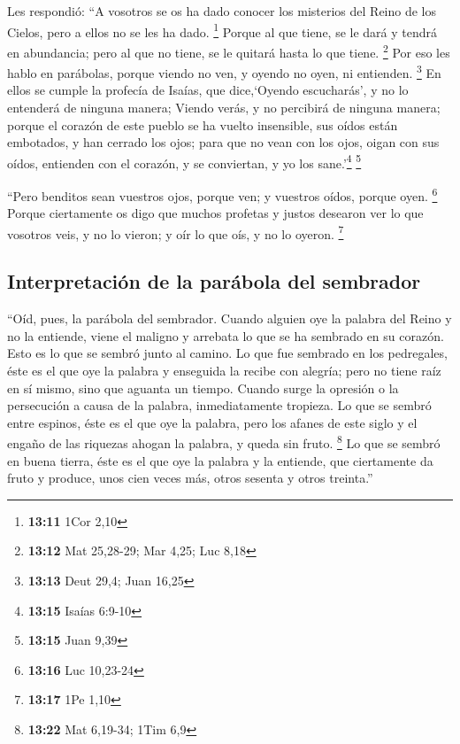 \begin{paracol}{2}
 Les respondió: ``A vosotros se os ha dado conocer los
misterios del Reino de los Cielos, pero a ellos no se les ha dado.
\footnote{\textbf{13:11} 1Cor 2,10}  Porque al que tiene,
se le dará y tendrá en abundancia; pero al que no tiene, se le quitará
hasta lo que tiene. \footnote{\textbf{13:12} Mat 25,28-29; Mar 4,25; Luc
  8,18}  Por eso les hablo en parábolas, porque viendo no
ven, y oyendo no oyen, ni entienden. \footnote{\textbf{13:13} Deut 29,4;
  Juan 16,25}  En ellos se cumple la profecía de Isaías,
que dice,`Oyendo escucharás', y no lo entenderá de ninguna manera;
Viendo verás, y no percibirá de ninguna manera;  porque
el corazón de este pueblo se ha vuelto insensible, sus oídos están
embotados, y han cerrado los ojos; para que no vean con los ojos, oigan
con sus oídos, entienden con el corazón, y se conviertan, y yo los
sane.'\footnote{\textbf{13:15} Isaías 6:9-10} \footnote{\textbf{13:15}
  Juan 9,39}

 ``Pero benditos sean vuestros ojos, porque ven; y
vuestros oídos, porque oyen. \footnote{\textbf{13:16} Luc 10,23-24}
 Porque ciertamente os digo que muchos profetas y justos
desearon ver lo que vosotros veis, y no lo vieron; y oír lo que oís, y
no lo oyeron. \footnote{\textbf{13:17} 1Pe 1,10}

\hypertarget{interpretaciuxf3n-de-la-paruxe1bola-del-sembrador}{%
\subsection{Interpretación de la parábola del
sembrador}\label{interpretaciuxf3n-de-la-paruxe1bola-del-sembrador}}

 ``Oíd, pues, la parábola del sembrador. 
Cuando alguien oye la palabra del Reino y no la entiende, viene el
maligno y arrebata lo que se ha sembrado en su corazón. Esto es lo que
se sembró junto al camino.  Lo que fue sembrado en los
pedregales, éste es el que oye la palabra y enseguida la recibe con
alegría;  pero no tiene raíz en sí mismo, sino que
aguanta un tiempo. Cuando surge la opresión o la persecución a causa de
la palabra, inmediatamente tropieza.  Lo que se sembró
entre espinos, éste es el que oye la palabra, pero los afanes de este
siglo y el engaño de las riquezas ahogan la palabra, y queda sin fruto.
\footnote{\textbf{13:22} Mat 6,19-34; 1Tim 6,9}  Lo que
se sembró en buena tierra, éste es el que oye la palabra y la entiende,
que ciertamente da fruto y produce, unos cien veces más, otros sesenta y
otros treinta.''


\end{paracol}
